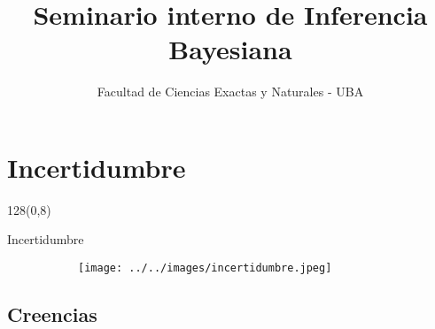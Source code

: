 \documentclass[shownotes]{beamer}
\title[Inferencia Bayesiana]{Seminario interno de Inferencia Bayesiana}
\author[FCEN - UBA]{Facultad de Ciencias Exactas y Naturales - UBA}
\institute[DC-ICC-CONICET]{\vspace{1.25cm} \texttt{[image: ../../images/logofcen]}}
\date{}
\begin{document}
\small

\begin{frame}[noframenumbering]
 
% 
 \vspace{2cm}
\maketitle
 
\end{frame}


\section{Incertidumbre}
\begin{frame}
\begin{textblock}{128}(0,8)
\begin{center}
 \Large Incertidumbre
\end{center}
\end{textblock}

\vspace{0.75cm}

\begin{figure}[H]     
     \centering \normalsize
     \begin{subfigure}[b]{0.75\textwidth}
       \texttt{[image: ../../images/incertidumbre.jpeg]} 
     \end{subfigure}
\end{figure}

\end{frame}

\subsection{Creencias}
\end{document}
